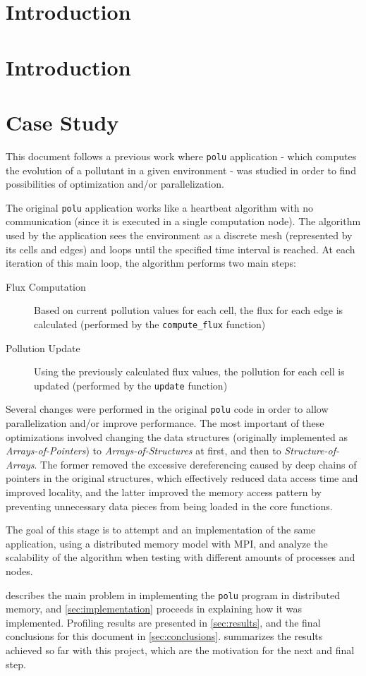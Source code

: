 \section{Introduction}
\label{sec:intro}

\section{Introduction}
\section{Case Study}

This document follows a previous work where \texttt{polu} application - which computes the evolution of a pollutant in a given environment - was studied in order to find possibilities of optimization and/or parallelization.

The original \texttt{polu} application works like a heartbeat algorithm with no communication (since it is executed in a single computation node). The algorithm used by the application sees the environment as a discrete mesh (represented by its cells and edges) and loops until the specified time interval is reached. At each iteration of this main loop, the algorithm performs two main steps:

\begin{description}
	\item[Flux Computation] Based on current pollution values for each cell, the flux for each edge is calculated (performed by the \texttt{compute\_flux} function)
	\item[Pollution Update] Using the previously calculated flux values, the pollution for each cell is updated (performed by the \texttt{update} function)
\end{description}

Several changes were performed in the original \texttt{polu} code in order to allow parallelization and/or improve performance. The most important of these optimizations involved changing the data structures (originally implemented as \textit{Arrays-of-Pointers}) to \textit{Arrays-of-Structures} at first, and then to \textit{Structure-of-Arrays}. The former removed the excessive dereferencing caused by deep chains of pointers in the original structures, which effectively reduced data access time and improved locality, and the latter improved the memory access pattern by preventing unnecessary data pieces from being loaded in the core functions.

The goal of this stage is to attempt and an implementation of the same application, using a distributed memory model with MPI, and analyze the scalability of the algorithm when testing with different amounts of processes and nodes.

 describes the main problem in implementing the \texttt{polu} program in distributed memory, and \cref{sec:implementation} proceeds in explaining how it was implemented. Profiling results are presented in \cref{sec:results}, and the final conclusions for this document in \cref{sec:conclusions}.  summarizes the results achieved so far with this project, which are the motivation for the next and final step.
